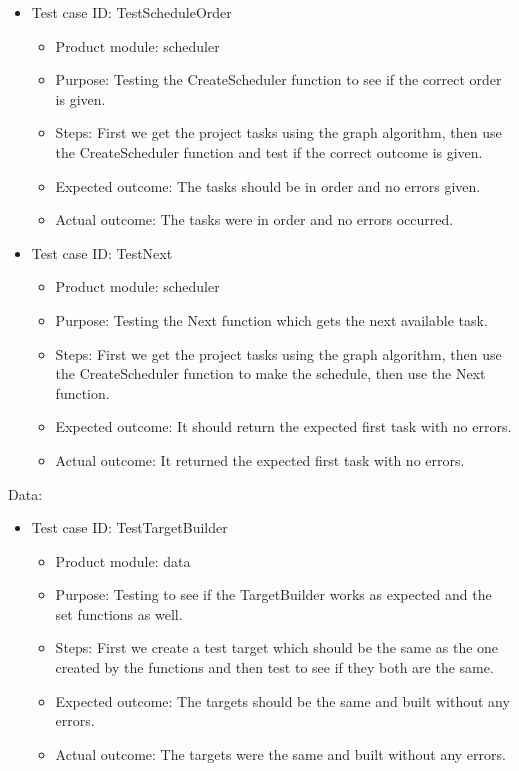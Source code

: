 \documentclass[11pt]{article}
\begin{document}
\begin{itemize}
    \item Test case ID: TestScheduleOrder
    \begin{itemize}
        \item Product module: scheduler
        \item Purpose: Testing the CreateScheduler function to see if the correct order is given.
        \item Steps: First we get the project tasks using the graph algorithm, then use the CreateScheduler function and test if the correct outcome is given.
        \item Expected outcome: The tasks should be in order and no errors given.
        \item Actual outcome: The tasks were in order and no errors occurred.
    \end{itemize}
\end{itemize}

\begin{itemize}
    \item Test case ID: TestNext
    \begin{itemize}
        \item Product module: scheduler
        \item Purpose: Testing the Next function which gets the next available task.
        \item Steps: First we get the project tasks using the graph algorithm, then use the CreateScheduler function to make the schedule, then use the Next function.
        \item Expected outcome: It should return the expected first task with no errors.
        \item Actual outcome: It returned the expected first task with no errors.
    \end{itemize}
\end{itemize}

Data:
\begin{itemize}
    \item Test case ID: TestTargetBuilder
    \begin{itemize}
        \item Product module: data
        \item Purpose: Testing to see if the TargetBuilder works as expected and the set functions as well.
        \item Steps: First we create a test target which should be the same as the one created by the functions and then test to see if they both are the same.
        \item Expected outcome: The targets should be the same and built without any errors.
        \item Actual outcome: The targets were the same and built without any errors.
    \end{itemize}
\end{itemize}
\end{document}
